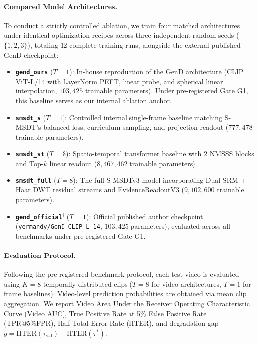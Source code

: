 \paragraph{Compared Model Architectures.}
To conduct a strictly controlled ablation, we train four matched architectures under identical optimization recipes across three independent random seeds ($\{1, 2, 3\}$), totaling 12 complete training runs, alongside the external published GenD checkpoint:
\begin{itemize}[leftmargin=*]
    \item \textbf{\texttt{gend\_ours}} ($T=1$): In-house reproduction of the GenD architecture \citep{gend2024} (CLIP ViT-L/14 with LayerNorm PEFT, linear probe, and spherical linear interpolation, $103{,}425$ trainable parameters). Under pre-registered Gate G1, this baseline serves as our internal ablation anchor.
    \item \textbf{\texttt{smsdt\_s}} ($T=1$): Controlled internal single-frame baseline matching S-MSDT's balanced loss, curriculum sampling, and projection readout ($777{,}478$ trainable parameters).
    \item \textbf{\texttt{smsdt\_st}} ($T=8$): Spatio-temporal transformer baseline with 2 NMSSS blocks and Top-$k$ linear readout ($8{,}467{,}462$ trainable parameters).
    \item \textbf{\texttt{smsdt\_full}} ($T=8$): The full S-MSDTv3 model incorporating Dual SRM + Haar DWT residual streams and EvidenceReadoutV3 ($9{,}102{,}600$ trainable parameters).
    \item \textbf{\texttt{gend\_official}}$^\dagger$ ($T=1$): Official published author checkpoint (\texttt{yermandy/GenD\_CLIP\_L\_14}, $103{,}425$ parameters), evaluated across all benchmarks under pre-registered Gate G1.
\end{itemize}

\paragraph{Evaluation Protocol.}
Following the pre-registered benchmark protocol, each test video is evaluated using $K=8$ temporally distributed clips ($T=8$ for video architectures, $T=1$ for frame baselines). Video-level prediction probabilities are obtained via mean clip aggregation. We report Video Area Under the Receiver Operating Characteristic Curve (Video AUC), True Positive Rate at 5\% False Positive Rate (TPR@5\%FPR), Half Total Error Rate (HTER), and degradation gap $g = \text{HTER}(\tau_{\text{val}}) - \text{HTER}(\tau^*)$.

